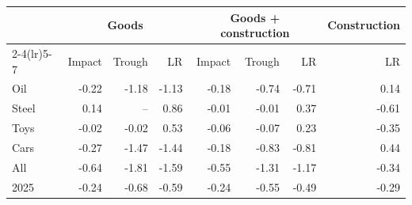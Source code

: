 \begin{tabular}{lrrrrrrr}
\toprule
 & \multicolumn{3}{c}{Goods} & \multicolumn{3}{c}{Goods + construction} & Construction \\
\cmidrule(lr){2-4}\cmidrule(lr){5-7}
 & Impact & Trough & LR & Impact & Trough & LR & LR \\
\midrule
Oil & -0.22 & -1.18 & -1.13 & -0.18 & -0.74 & -0.71 & 0.14 \\
Steel & 0.14 & -- & 0.86 & -0.01 & -0.01 & 0.37 & -0.61 \\
Toys & -0.02 & -0.02 & 0.53 & -0.06 & -0.07 & 0.23 & -0.35 \\
Cars & -0.27 & -1.47 & -1.44 & -0.18 & -0.83 & -0.81 & 0.44 \\
All & -0.64 & -1.81 & -1.59 & -0.55 & -1.31 & -1.17 & -0.34 \\
2025 & -0.24 & -0.68 & -0.59 & -0.24 & -0.55 & -0.49 & -0.29 \\
\bottomrule
\end{tabular}
